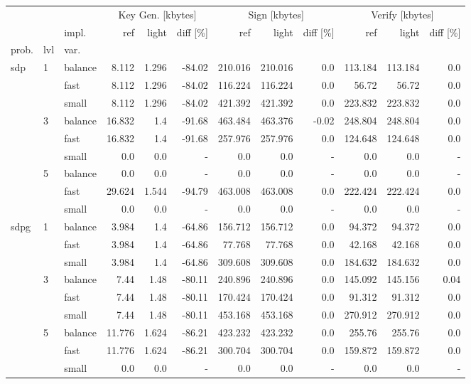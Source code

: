 \begin{tabular}{lll|r|r|r|r|r|r|r|r|r|}
\toprule
 &  &  & \multicolumn{3}{c}{Key Gen. [kbytes]} & \multicolumn{3}{c}{Sign [kbytes]} & \multicolumn{3}{c}{Verify [kbytes]} \\
 &  & impl. & ref & light & diff [\%] & ref & light & diff [\%] & ref & light & diff [\%] \\
prob. & lvl & var. &  &  &  &  &  &  &  &  &  \\
\midrule
\multirow[c]{9}{*}{sdp} & \multirow[c]{3}{*}{1} & balance & 8.112 & 1.296 & -84.02 & 210.016 & 210.016 & 0.0 & 113.184 & 113.184 & 0.0 \\
 &  & fast & 8.112 & 1.296 & -84.02 & 116.224 & 116.224 & 0.0 & 56.72 & 56.72 & 0.0 \\
 &  & small & 8.112 & 1.296 & -84.02 & 421.392 & 421.392 & 0.0 & 223.832 & 223.832 & 0.0 \\
\cline{2-12}
 & \multirow[c]{3}{*}{3} & balance & 16.832 & 1.4 & -91.68 & 463.484 & 463.376 & -0.02 & 248.804 & 248.804 & 0.0 \\
 &  & fast & 16.832 & 1.4 & -91.68 & 257.976 & 257.976 & 0.0 & 124.648 & 124.648 & 0.0 \\
 &  & small & 0.0 & 0.0 & - & 0.0 & 0.0 & - & 0.0 & 0.0 & - \\
\cline{2-12}
 & \multirow[c]{3}{*}{5} & balance & 0.0 & 0.0 & - & 0.0 & 0.0 & - & 0.0 & 0.0 & - \\
 &  & fast & 29.624 & 1.544 & -94.79 & 463.008 & 463.008 & 0.0 & 222.424 & 222.424 & 0.0 \\
 &  & small & 0.0 & 0.0 & - & 0.0 & 0.0 & - & 0.0 & 0.0 & - \\
\cline{1-12} \cline{2-12}
\multirow[c]{9}{*}{sdpg} & \multirow[c]{3}{*}{1} & balance & 3.984 & 1.4 & -64.86 & 156.712 & 156.712 & 0.0 & 94.372 & 94.372 & 0.0 \\
 &  & fast & 3.984 & 1.4 & -64.86 & 77.768 & 77.768 & 0.0 & 42.168 & 42.168 & 0.0 \\
 &  & small & 3.984 & 1.4 & -64.86 & 309.608 & 309.608 & 0.0 & 184.632 & 184.632 & 0.0 \\
\cline{2-12}
 & \multirow[c]{3}{*}{3} & balance & 7.44 & 1.48 & -80.11 & 240.896 & 240.896 & 0.0 & 145.092 & 145.156 & 0.04 \\
 &  & fast & 7.44 & 1.48 & -80.11 & 170.424 & 170.424 & 0.0 & 91.312 & 91.312 & 0.0 \\
 &  & small & 7.44 & 1.48 & -80.11 & 453.168 & 453.168 & 0.0 & 270.912 & 270.912 & 0.0 \\
\cline{2-12}
 & \multirow[c]{3}{*}{5} & balance & 11.776 & 1.624 & -86.21 & 423.232 & 423.232 & 0.0 & 255.76 & 255.76 & 0.0 \\
 &  & fast & 11.776 & 1.624 & -86.21 & 300.704 & 300.704 & 0.0 & 159.872 & 159.872 & 0.0 \\
 &  & small & 0.0 & 0.0 & - & 0.0 & 0.0 & - & 0.0 & 0.0 & - \\
\cline{1-12} \cline{2-12}
\bottomrule
\end{tabular}
